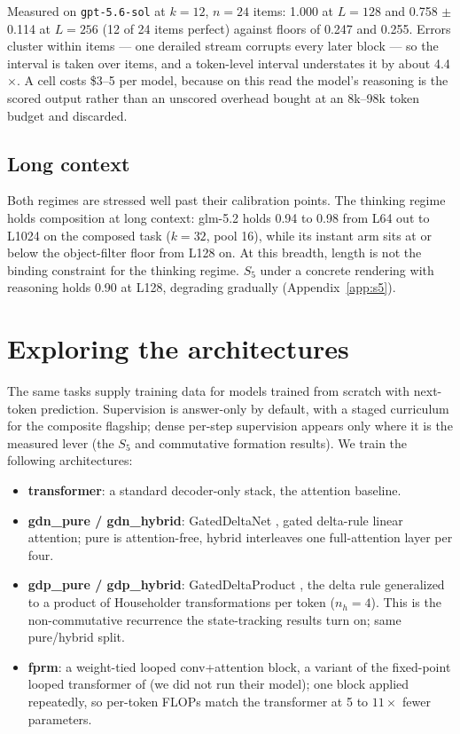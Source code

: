 \documentclass[11pt]{article}
\newcommand{\Sfive}{$S_5$}
\newcommand{\code}[1]{\texttt{#1}}
\begin{document}
Measured on \code{gpt-5.6-sol} at $k=12$, $n=24$ items: 1.000 at $L=128$ and 0.758 $\pm$ 0.114
at $L=256$ (12 of 24 items perfect) against floors of 0.247 and 0.255. Errors cluster within
items --- one derailed stream corrupts every later block --- so the interval is taken over items,
and a token-level interval understates it by about 4.4$\times$. A cell costs \$3--5 per model,
because on this read the model's reasoning is the scored output rather than an unscored overhead
bought at an 8k--98k token budget and discarded.

\subsection{Long context}

Both regimes are stressed well past their calibration points. The thinking regime holds
composition at long context: glm-5.2 holds 0.94 to 0.98 from L64 out to L1024 on the composed
task ($k=32$, pool 16), while its instant arm sits at or below the object-filter floor from
L128 on. At this breadth, length is not the binding constraint for the thinking regime.
\Sfive{} under a concrete rendering with reasoning holds 0.90 at L128, degrading gradually
(Appendix~\ref{app:s5}).

\section{Exploring the architectures}

The same tasks supply training data for models trained from scratch with next-token prediction. Supervision is answer-only by default, with a staged curriculum for the composite flagship; dense per-step supervision
appears only where it is the measured lever (the \Sfive{} and commutative formation results). We train the following architectures:

\begin{itemize}
\item \textbf{transformer}: a standard decoder-only stack, the attention baseline.
\item \textbf{gdn\_pure / gdn\_hybrid}: GatedDeltaNet \citep{yang2024gated}, gated delta-rule
  linear attention; pure is attention-free, hybrid interleaves one full-attention layer per
  four.
\item \textbf{gdp\_pure / gdp\_hybrid}: GatedDeltaProduct \citep{siems2025deltaproduct}, the
  delta rule generalized to a product of Householder transformations per token ($n_h=4$). This
  is the non-commutative recurrence the state-tracking results turn on; same pure/hybrid
  split.
\item \textbf{fprm}: a weight-tied looped conv+attention block, a variant of the
  fixed-point looped transformer of \citet{movahedi2026fixedpoint} (we did not run their
  model); one block applied repeatedly, so per-token FLOPs match the transformer at 5 to
  $11\times$ fewer parameters.
\end{itemize}
\end{document}
